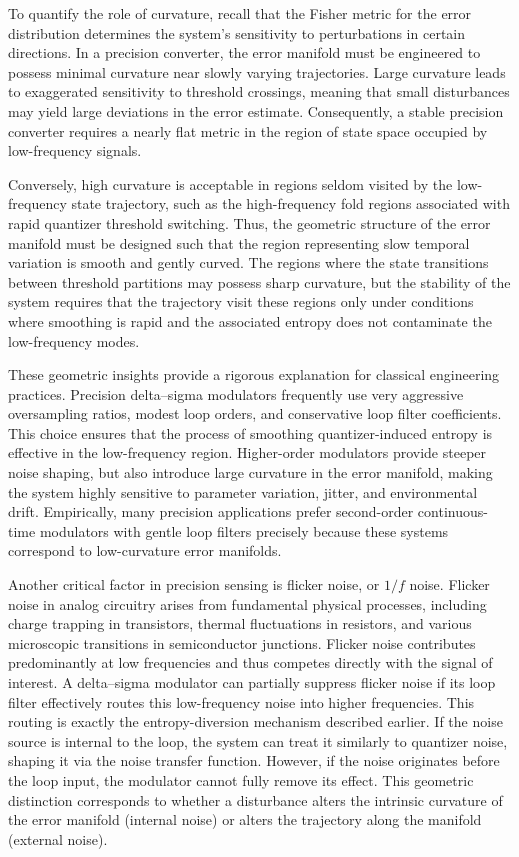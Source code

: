 To quantify the role of curvature, recall that the Fisher metric for the error distribution determines the system's sensitivity to perturbations in certain directions. In a precision converter, the error manifold must be engineered to possess minimal curvature near slowly varying trajectories. Large curvature leads to exaggerated sensitivity to threshold crossings, meaning that small disturbances may yield large deviations in the error estimate. Consequently, a stable precision converter requires a nearly flat metric in the region of state space occupied by low-frequency signals.

Conversely, high curvature is acceptable in regions seldom visited by the low-frequency state trajectory, such as the high-frequency fold regions associated with rapid quantizer threshold switching. Thus, the geometric structure of the error manifold must be designed such that the region representing slow temporal variation is smooth and gently curved. The regions where the state transitions between threshold partitions may possess sharp curvature, but the stability of the system requires that the trajectory visit these regions only under conditions where smoothing is rapid and the associated entropy does not contaminate the low-frequency modes.

These geometric insights provide a rigorous explanation for classical engineering practices. Precision delta–sigma modulators frequently use very aggressive oversampling ratios, modest loop orders, and conservative loop filter coefficients. This choice ensures that the process of smoothing quantizer-induced entropy is effective in the low-frequency region. Higher-order modulators provide steeper noise shaping, but also introduce large curvature in the error manifold, making the system highly sensitive to parameter variation, jitter, and environmental drift. Empirically, many precision applications prefer second-order continuous-time modulators with gentle loop filters precisely because these systems correspond to low-curvature error manifolds.

Another critical factor in precision sensing is flicker noise, or \(1/f\) noise. Flicker noise in analog circuitry arises from fundamental physical processes, including charge trapping in transistors, thermal fluctuations in resistors, and various microscopic transitions in semiconductor junctions. Flicker noise contributes predominantly at low frequencies and thus competes directly with the signal of interest. A delta–sigma modulator can partially suppress flicker noise if its loop filter effectively routes this low-frequency noise into higher frequencies. This routing is exactly the entropy-diversion mechanism described earlier. If the noise source is internal to the loop, the system can treat it similarly to quantizer noise, shaping it via the noise transfer function. However, if the noise originates before the loop input, the modulator cannot fully remove its effect. This geometric distinction corresponds to whether a disturbance alters the intrinsic curvature of the error manifold (internal noise) or alters the trajectory along the manifold (external noise).

